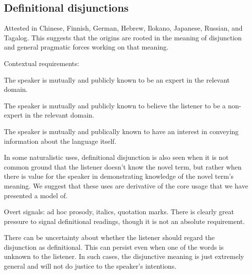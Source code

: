 \documentclass{article}
\begin{document}

\subsection{Definitional disjunctions}\label{sec:data:definitional}

\begin{examples}
\item Attested in Chinese, Finnish, German, Hebrew, Ilokano, Japanese,
  Russian, and Tagalog. This suggests that the origins are rooted in
  the meaning of disjunction and general pragmatic forces working on
  that meaning.

\item Contextual requirements: 

  \begin{examples}
  \item The speaker is mutually and publicly known to be an expert in
    the relevant domain.

  \item The speaker is mutually and publicly known to believe the
    listener to be a non-expert in the relevant domain.

  \item The speaker is mutually and publically known to have an
    interest in conveying information about the language itself.
  \end{examples}

\item In some naturalistic uses, definitional disjunction is also seen
  when it is not common ground that the listener doesn't know the
  novel term, but rather when there is value for the speaker in
  demonstrating knowledge of the novel term's meaning.  We suggest
  that these uses are derivative of the core usage that we have
  presented a model of.

\item Overt signals: ad hoc prosody, italics, quotation marks. There is
  clearly great pressure to signal definitional readings, though it is
  not an absolute requirement.

\item There can be uncertainty about whether the listener should
  regard the disjunction as definitional. This can persist even when
  one of the words is unknown to the listener. In such cases, the
  disjunctive meaning is just extremely general and will not do
  justice to the speaker's intentions.


\end{examples}
\end{document}
